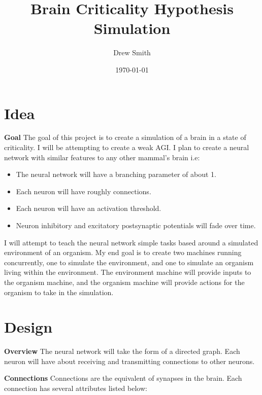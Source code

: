 \documentclass{article} %
\title{Brain Criticality Hypothesis Simulation} %
\author{Drew Smith} %
\date{\today} %
\begin{document}
    \maketitle %
    
    \section{Idea} %
    
    \textbf{Goal} The goal of this project is to create a simulation of a brain in a state of criticality. I will be attempting to create a weak AGI. I plan to create a neural network with similar features to any other mammal's brain i.e:
    
    \begin{itemize}[noitemsep]
        \item The neural network will have a branching parameter of about 1.
        \item Each neuron will have roughly \connectionCount connections.
        \item Each neuron will have an activation threshold.
        \item Neuron inhibitory and excitatory postsynaptic potentials will fade over time.
    \end{itemize}

    I will attempt to teach the neural network simple tasks based around a simulated environment of an organism. My end goal is to create two machines running concurrently, one to simulate the environment, and one to simulate an organism living within the environment. The environment machine will provide inputs to the organism machine, and the organism machine will provide actions for the organism to take in the simulation.

    \section{Design}

    \textbf{Overview} The neural network will take the form of a directed graph. Each neuron will have about \connectionCount receiving and transmitting connections to other neurons.\newline

    \textbf{Connections} Connections are the equivalent of synapses in the brain. Each connection has several attributes listed below: 
\end{document}
